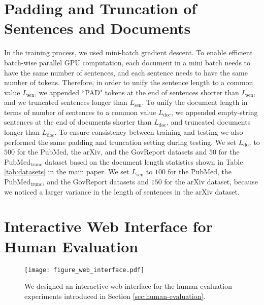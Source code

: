 \documentclass[11pt]{article}
\begin{document}
\section{Padding and Truncation of Sentences and Documents}
In the training process, we used mini-batch gradient descent. To enable efficient batch-wise parallel GPU computation, each document in a mini batch needs to have the same number of sentences, and each sentence needs to have the same number of tokens. Therefore, in order to unify the sentence length to a common value $L_\text{sen}$, we appended ``PAD" tokens at the end of sentences shorter than $L_\text{sen}$, and we truncated sentences longer than $L_\text{sen}$. To  unify the document length in terms of number of sentences to a common value $L_\text{doc}$, we appended empty-string sentences at the end of documents shorter than $L_\text{doc}$, and truncated documents longer than $L_\text{doc}$. To ensure consistency between training and testing we also performed the same padding and truncation setting during testing. We set $L_\text{doc}$ to $500$ for the PubMed, the arXiv, and the GovReport datasets and $50$ for the PubMed$_\text{trunc}$ dataset based on the document length statistics shown in Table \ref{tab:datasets} in the main paper. We set $L_\text{sen}$ to $100$ for the PubMed, the PubMed$_\text{trunc}$, and the GovReport datasets and $150$ for the arXiv dataset, because we noticed a larger variance in the length of sentences in the arXiv dataset.











\section{Interactive Web Interface for Human Evaluation}
\label{sec:web-interface}
\begin{figure*}
\centering
  \texttt{[image: figure\_web\_interface.pdf]}
  \caption{We designed an interactive web interface for the human evaluation experiments introduced in Section \ref{sec:human-evaluation}.}
  \label{fig:web_interface}
\end{figure*}
\end{document}
